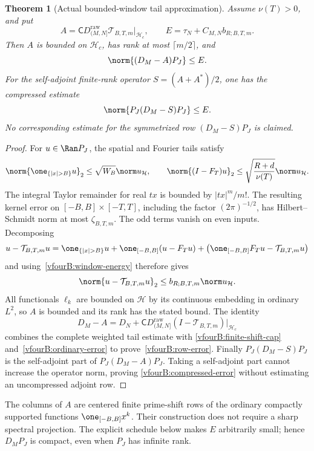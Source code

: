 \documentclass[11pt,a4paper]{article}
\numberwithin{equation}{section}
\newtheorem{theorem}{Theorem}[section]
\theoremstyle{definition}\newtheorem{definition}[theorem]{Definition}
\theoremstyle{remark}\newtheorem{remark}[theorem]{Remark}
\newcommand{\Hh}{\mathcal H}\newcommand{\Hw}{\mathcal H}
\begin{document}
\begin{theorem}[Actual bounded-window tail approximation]
\label{vfourB:approximation-theorem}
Assume $\nu(T)>0$, and put
\[
 A=\mathsf C D_{(M,N]}^{\mathrm{raw}}
                   \mathcal T_{B,T,m}|_{\Hh_c},\qquad
 E=\tau_N+C_{M,N}b_{R;B,T,m}.
\]
Then $A$ is bounded on $\Hh_c$, has rank at most $\lceil m/2\rceil$, and
\begin{equation}\label{vfourB:row-error}
 \norm{(D_M-A)P_J}\le E.
\end{equation}
For the self-adjoint finite-rank operator $S=(A+A^*)/2$, one has the
\emph{compressed} estimate
\begin{equation}\label{vfourB:compressed-error}
 \norm{P_J(D_M-S)P_J}\le E.
\end{equation}
No corresponding estimate for the symmetrized row $(D_M-S)P_J$ is claimed.
\end{theorem}
\begin{proof}
For $u\in\Ran P_J$, the spatial and Fourier tails satisfy
\[
 \norm{\one_{\{|x|>B\}}u}_2\le\sqrt{W_B}\norm u_{\Hh},\qquad
 \norm{(I-F_T)u}_2
 \le\sqrt{\frac{R+d}{\nu(T)}}\norm u_{\Hh}.
\]
The integral Taylor remainder for real $tx$ is bounded by
$|tx|^m/m!$. The resulting kernel error on
$[-B,B]\times[-T,T]$, including the factor $(2\pi)^{-1/2}$, has
Hilbert--Schmidt norm at most $\zeta_{B,T,m}$. The odd terms vanish on even
inputs. Decomposing
\[
 u-\mathcal T_{B,T,m}u
 =\one_{\{|x|>B\}}u+\one_{[-B,B]}(u-F_Tu)
   +\bigl(\one_{[-B,B]}F_Tu-\mathcal T_{B,T,m}u\bigr)
\]
and using~\eqref{vfourB:window-energy} therefore gives
\begin{equation}\label{vfourB:ordinary-error}
 \norm{u-\mathcal T_{B,T,m}u}_2
 \le b_{R;B,T,m}\norm u_{\Hh}.
\end{equation}
All functionals $\ell_k$ are bounded on $\Hh$ by its continuous embedding
in ordinary $L^2$, so $A$ is bounded and its rank has the stated bound.
The identity
\[
 D_M-A=D_N+\mathsf C D_{(M,N]}^{\mathrm{raw}}
                         (I-\mathcal T_{B,T,m})|_{\Hh_c}
\]
combines the complete weighted tail estimate with
\eqref{vfourB:finite-shift-cap} and~\eqref{vfourB:ordinary-error} to
prove~\eqref{vfourB:row-error}. Finally
$P_J(D_M-S)P_J$ is the self-adjoint part of $P_J(D_M-A)P_J$.
Taking a self-adjoint part cannot increase the operator norm, proving
\eqref{vfourB:compressed-error} without estimating an uncompressed
adjoint row.
\end{proof}

The columns of $A$ are centered finite prime-shift rows of the ordinary
compactly supported functions $\one_{[-B,B]}x^k$. Their construction does
not require a sharp spectral projection. The explicit schedule below
makes $E$ arbitrarily small; hence $D_MP_J$ is compact, even when $P_J$
has infinite rank.
\end{document}
